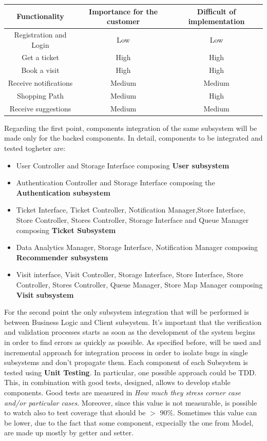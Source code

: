 \documentclass[a4paper, 12pt, oneside, table]{article}
\begin{document}
\begin{center}
 \begin{tabular}{||c | c | c||} 
 \hline
 Functionality & Importance for the customer & Difficult of implementation \\ [0.5ex] 
 \hline\hline
 Registration and Login & Low & Low  \\ 
 \hline
 Get a ticket & High & High  \\
 \hline
 Book a visit & High & High  \\
 \hline
 Receive notifications & Medium & Medium  \\
 \hline
 Shopping Path & Medium & High  \\ 
 \hline
 Receive suggestions & Medium & Medium  \\
 \hline
\end{tabular}
\end{center}

Regarding the first point, components integration of the same subsystem will be made only for the backed components. In detail, components to be integrated and tested togheter are:
\begin{itemize}
    \item User Controller and Storage Interface composing \textbf{User subsystem}
    \item Authentication Controller and Storage Interface composing the \textbf{Authentication subsystem}
    \item Ticket Interface, Ticket Controller, Notification Manager,Store Interface, Store Controller, Stores Controller, Storage Interface and Queue Manager composing \textbf{Ticket Subsystem}
    \item Data Analytics Manager, Storage Interface, Notification Manager composing \textbf{Recommender subsystem}
    \item Visit interface, Visit Controller, Storage Interface, Store Interface, Store Controller, Stores Controller, Queue Manager, Store Map Manager composing \textbf{Visit subsystem}
\end{itemize}

For the second point the only subsystem integration that will be performed is between Business Logic and Client subsystem. It's important that the verification and validation processes starts as soon as the development of the system begins in order to find errors as quickly as possible.
As specified before, will be used and incremental approach for integration process in order to isolate bugs in single subsystems and don't propagate them.
Each component of each Subsystem is tested using \textbf{Unit Testing}. 
In particular, one possible approach could be TDD. This, in combination with good tests, designed, allows to develop stable components. Good tests are measured in \textit{How much they stress corner case and/or particular cases}. Moreover, since this value is not measurable, is possible to watch also to test coverage that should be $>$ 90\%. Sometimes this value can be lower, due to the fact that some component, expecially the one from Model, are made up mostly by getter and setter.\\
\end{document}
